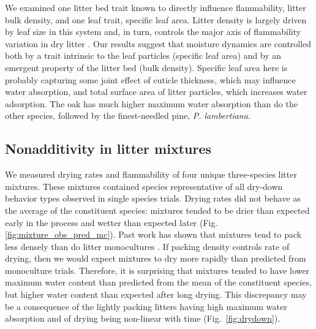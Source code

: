 \documentclass[letterpaper,12pt]{article}
\begin{document}
We examined one litter bed trait known to directly influence flammability,
litter bulk density, and one leaf trait, specific leaf area. Litter density is
largely driven by leaf size in this system and, in turn, controls the major
axis of flammability variation in dry litter \citep{Magalhaes+Schwilk-2012}.
Our results suggest that moisture dynamics are controlled both by a trait
intrinsic to the leaf particles (specific leaf area) and by an emergent
property of the litter bed (bulk density). Specific leaf area here is probably
capturing some joint effect of cuticle thickness, which may influence water
absorption, and total surface area of litter particles, which increases water
adsorption. The oak has much higher maximum water absorption than do the other
species, followed by the finest-needled pine, \emph{P. lambertiana}.


\subsection*{Nonadditivity in litter mixtures}

We measured drying rates and flammability of four unique three-species litter
mixtures. These mixtures contained species representative of all dry-down
behavior types observed in single species trials. Drying rates did not behave
as the average of the constituent species: mixtures tended to be drier than
expected early in the process and wetter than expected later (Fig.
\ref{fig:mixture_obs_pred_mc}). Past work has shown that mixtures tend to pack
less densely than do litter monocultures \citep{Magalhaes+Schwilk-2012}. If
packing density controls rate of drying, then we would expect mixtures to dry
more rapidly than predicted from monoculture trials. Therefore, it is
surprising that mixtures tended to have lower maximum water content than
predicted from the mean of the constituent species, but higher water content
than expected after long drying. This discrepancy may be a consequence of the
lightly packing litters having high maximum water absorption and of drying
being non-linear with time (Fig.~\ref{fig:drydown}).

\end{document}
